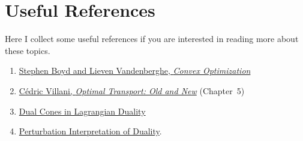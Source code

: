 \documentclass[11pt]{article}
\begin{document}
\section{Useful References}

Here I collect some useful references if you are interested in reading more about these topics.

\begin{enumerate}
  \item \href{https://web.stanford.edu/~boyd/cvxbook/}{Stephen Boyd and Lieven Vandenberghe, \emph{Convex Optimization}}
  \item \href{https://link.springer.com/book/10.1007/978-3-540-71050-9}{C\'edric Villani, \emph{Optimal Transport: Old and New}} (Chapter~5)
  \item \href{https://www.mit.edu/~gfarina/2025/67220s25_L03_more_on_normal_cones/L03.pdf}{Dual Cones in Lagrangian Duality}
  \item \href{https://math.stackexchange.com/questions/223235/please-explain-the-intuition-behind-the-dual-problem-in-optimization}{Perturbation Interpretation of Duality}.
\end{enumerate}
\end{document}
